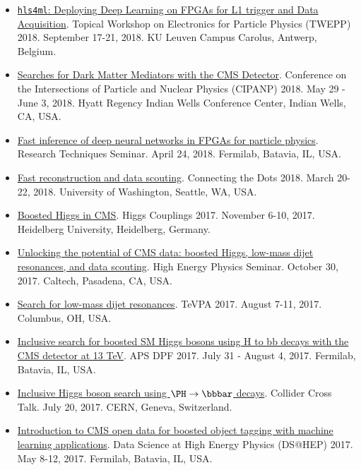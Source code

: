\documentclass[11pt]{res}
\begin{document}
\begin{resume}
\begin{itemize}
    \item \href{https://indico.cern.ch/event/697988/contributions/3055990/}{\texttt{hls4ml}: Deploying Deep Learning on FPGAs for L1 trigger and Data Acquisition}. Topical Workshop on Electronics for Particle Physics (TWEPP) 2018. September 17-21, 2018. KU Leuven Campus Carolus, Antwerp, Belgium.
    \item \href{https://conferences.lbl.gov/event/137/session/27/contribution/354}{Searches for Dark Matter Mediators with the CMS Detector}. Conference on the Intersections of Particle and Nuclear Physics (CIPANP) 2018. May 29 - June 3, 2018. Hyatt Regency Indian Wells Conference Center, Indian Wells, CA, USA.
    \item \href{https://indico.fnal.gov/event/16908/}{Fast inference of deep neural networks in FPGAs for particle physics}. Research Techniques Seminar. April 24, 2018. Fermilab, Batavia, IL, USA.
    \item \href{https://indico.cern.ch/event/658267/contributions/2881127/}{Fast reconstruction and data scouting}. Connecting the Dots 2018. March 20-22, 2018. University of Washington, Seattle, WA, USA.
    \item \href{http://www.thphys.uni-heidelberg.de/~higgs/talks/duarte.pdf}{Boosted Higgs in CMS}. Higgs Couplings 2017. November 6-10, 2017. Heidelberg University, Heidelberg, Germany.
    \item \href{https://indico.hep.caltech.edu/indico/conferenceDisplay.py?confId=149}{Unlocking the potential of CMS data: boosted Higgs, low-mass dijet resonances, and data scouting}. High Energy Physics Seminar. October 30, 2017. Caltech, Pasadena, CA, USA.
    \item \href{https://indico.cern.ch/event/615891/contributions/2666361/}{Search for low-mass dijet resonances}. TeVPA 2017. August 7-11, 2017. Columbus, OH, USA.
    \item \href{https://indico.fnal.gov/contributionDisplay.py?sessionId=14&contribId=38&confId=11999}{Inclusive search for boosted SM Higgs bosons using H to bb decays with the CMS detector at 13 TeV}. APS DPF 2017. July 31 - August 4, 2017. Fermilab, Batavia, IL, USA.
    \item \href{https://indico.cern.ch/event/649575/}{Inclusive Higgs boson search using $\PH\to\bbbar$ decays}. Collider Cross Talk. July 20, 2017. CERN, Geneva, Switzerland.
    \item \href{https://indico.fnal.gov/contributionDisplay.py?sessionId=6&contribId=54&confId=13497}{Introduction to CMS open data for boosted object tagging with machine learning applications}. Data Science at High Energy Physics (DS@HEP) 2017. May 8-12, 2017. Fermilab, Batavia, IL, USA.

\end{itemize}
\end{resume}
\end{document}
